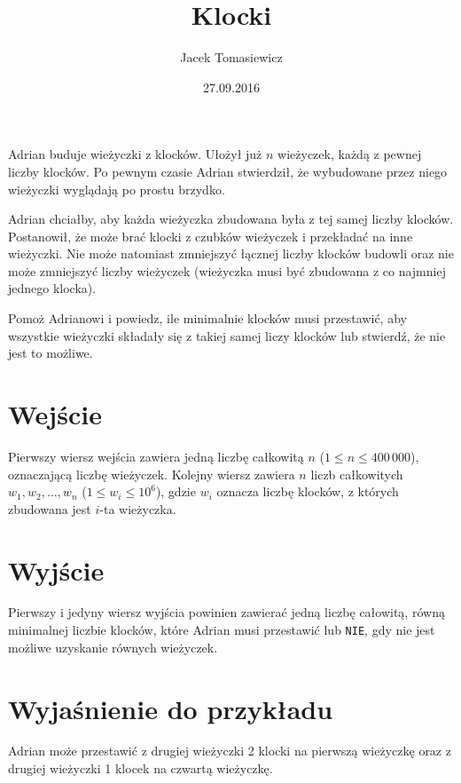 \documentclass[zad,zawodnik,utf8]{sinol}
\title{Klocki}
\author{Jacek Tomasiewicz} %
\date{27.09.2016}
\begin{document}
\begin{tasktext}%
Adrian buduje wieżyczki z klocków. Ułożył już $n$ wieżyczek, każdą z pewnej liczby  klocków. Po pewnym czasie Adrian stwierdził, że wybudowane przez niego wieżyczki  wyglądają po prostu brzydko.

Adrian chciałby, aby każda wieżyczka zbudowana była z tej samej liczby klocków.  Postanowił, że może brać klocki z czubków wieżyczek i przekładać na inne wieżyczki. Nie może natomiast zmniejszyć łącznej liczby klocków budowli oraz nie może zmniejszyć liczby wieżyczek (wieżyczka musi być zbudowana z co najmniej jednego klocka).

Pomoż Adrianowi i powiedz, ile minimalnie klocków musi przestawić, aby wszystkie wieżyczki składały się z takiej samej liczy klocków lub stwierdź, że nie jest to  możliwe.

  \section{Wejście}
Pierwszy wiersz wejścia zawiera jedną liczbę całkowitą $n$ ($1 \leq n \leq 400\,000$),  oznaczającą liczbę wieżyczek. Kolejny wiersz zawiera $n$ liczb całkowitych $w_1, w_2,  \ldots, w_n$ ($1 \leq w_i \leq 10^6$), gdzie $w_i$ oznacza liczbę klocków, z których  zbudowana jest $i$-ta wieżyczka.

  \section{Wyjście}
Pierwszy i jedyny wiersz wyjścia powinien zawierać jedną liczbę całowitą, równą  minimalnej liczbie klocków, które Adrian musi przestawić lub \texttt{NIE}, gdy nie jest  możliwe uzyskanie równych wieżyczek.

\makecompactexample
  
  \section{Wyjaśnienie do przykładu}
Adrian może przestawić z drugiej wieżyczki 2 klocki na  pierwszą wieżyczkę oraz z drugiej wieżyczki 1 klocek na czwartą wieżyczkę.

\end{tasktext}
\end{document}
